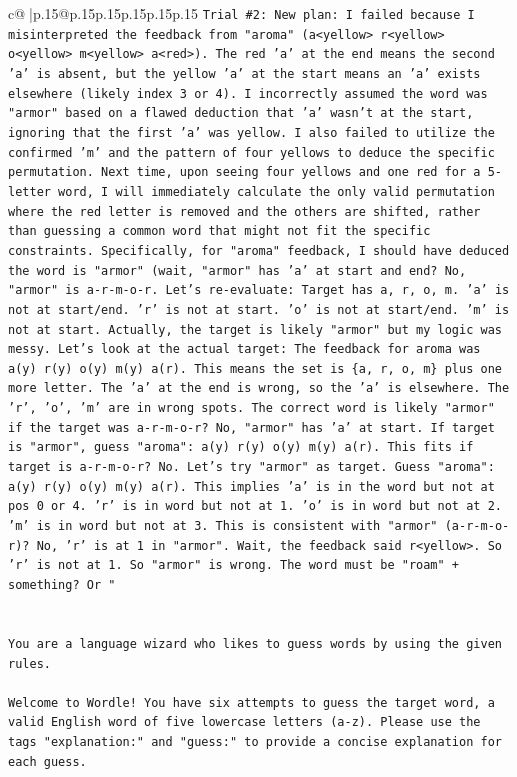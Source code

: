 \documentclass{article}
\begin{document}
{\begin{supertabular}{c@{$\;$}|p{.15\linewidth}@{}p{.15\linewidth}p{.15\linewidth}p{.15\linewidth}p{.15\linewidth}p{.15\linewidth}}
{{{\texttt{Trial \#2: New plan: I failed because I misinterpreted the feedback from "aroma" (a<yellow> r<yellow> o<yellow> m<yellow> a<red>). The red 'a' at the end means the second 'a' is absent, but the yellow 'a' at the start means an 'a' exists elsewhere (likely index 3 or 4). I incorrectly assumed the word was "armor" based on a flawed deduction that 'a' wasn't at the start, ignoring that the first 'a' was yellow. I also failed to utilize the confirmed 'm' and the pattern of four yellows to deduce the specific permutation. Next time, upon seeing four yellows and one red for a 5{-}letter word, I will immediately calculate the only valid permutation where the red letter is removed and the others are shifted, rather than guessing a common word that might not fit the specific constraints. Specifically, for "aroma" feedback, I should have deduced the word is "armor" (wait, "armor" has 'a' at start and end? No, "armor" is a{-}r{-}m{-}o{-}r. Let's re{-}evaluate: Target has a, r, o, m. 'a' is not at start/end. 'r' is not at start. 'o' is not at start/end. 'm' is not at start. Actually, the target is likely "armor" but my logic was messy. Let's look at the actual target: The feedback for aroma was a(y) r(y) o(y) m(y) a(r). This means the set is \{a, r, o, m\} plus one more letter. The 'a' at the end is wrong, so the 'a' is elsewhere. The 'r', 'o', 'm' are in wrong spots. The correct word is likely "armor" if the target was a{-}r{-}m{-}o{-}r? No, "armor" has 'a' at start. If target is "armor", guess "aroma": a(y) r(y) o(y) m(y) a(r). This fits if target is a{-}r{-}m{-}o{-}r? No. Let's try "armor" as target. Guess "aroma": a(y) r(y) o(y) m(y) a(r). This implies 'a' is in the word but not at pos 0 or 4. 'r' is in word but not at 1. 'o' is in word but not at 2. 'm' is in word but not at 3. This is consistent with "armor" (a{-}r{-}m{-}o{-}r)? No, 'r' is at 1 in "armor". Wait, the feedback said r<yellow>. So 'r' is not at 1. So "armor" is wrong. The word must be "roam" + something? Or "} \\
\\ 
\\ 
\texttt{You are a language wizard who likes to guess words by using the given rules.} \\
\\ 
\texttt{Welcome to Wordle! You have six attempts to guess the target word, a valid English word of five lowercase letters (a{-}z). Please use the tags "explanation:" and "guess:" to provide a concise explanation for each guess.} \\
\\ 
}}}
\end{supertabular}}
\end{document}

